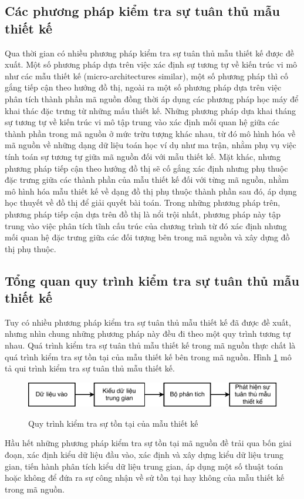 \documentclass[12pt]{report}
\begin{document}
\subsection{Các phương pháp kiểm tra sự tuân thủ mẫu thiết kế}
Qua thời gian có nhiều phương pháp kiểm tra sự tuân thủ mẫu thiết kế được đề xuất. Một số phương pháp dựa trên việc xác định sự tương tự về kiến trúc vi mô như các mẫu thiết kế (micro-architectures similar), một số phương pháp thì cố gắng tiếp cận theo hướng đồ thị, ngoài ra một số phương pháp dựa trên việc phân tích thành phần mã nguồn đồng thời áp dụng các phương pháp học máy để khai thác đặc trưng từ những mấu thiết kế. Những phương pháp dựa khai tháng sự tương tự về kiến trúc vi mô tập trung vào xác định mối quan hệ giữa các thành phần trong mã nguồn ở mức trừu tượng khác nhau, từ đó mô hình hóa về mã nguồn về những dạng dữ liệu toán học ví dụ như ma trận, nhằm phụ vụ việc tính toán sự tương tự giữa mã nguồn đối với mẫu thiết kế.
Mặt khác, nhưng phương pháp tiếp cận theo hướng đồ thị sẽ cố gắng xác định nhưng phụ thuộc đặc trưng giữa các thành phần của mẫu thiết kế đối với từng mã nguồn, nhằm mô hình hóa mẫu thiết kế về dạng đồ thị phụ thuộc thành phần sau đó, áp dụng học thuyết về đồ thị để giải quyết bài toán. Trong những phương pháp trên, phương pháp tiếp cận dựa trên đồ thị là nổi trội nhất, phương pháp này tập trung vào việc phân tích tĩnh cấu trúc của chương trình từ đó xác định nhưng mối quan hệ đặc trưng giữa các đối tượng bên trong mã nguồn và xây dựng đồ thị phụ thuộc.

\subsection{Tổng quan quy trình kiểm tra sự tuân thủ mẫu thiết kế}
Tuy có nhiều phương pháp kiểm tra sự tuân thủ mẫu thiết kế đã được đề xuất, nhưng nhìn chung những phương pháp này đều đi theo một quy trình tương tự nhau. Quá trình kiểm tra sự tuân thủ mẫu thiết kế trong mã nguồn thực chất là quá trình kiểm tra sự tồn tại của mẫu thiết kế bên trong mã nguồn.
Hình \ref{fig:ddp_process} mô tả qui trình kiểm tra sự tuân thủ mẫu thiết kế.
\begin{figure}[h]
	\centering
	\includegraphics[scale=0.3]{images/ddp}
	\label{fig:ddp_process}
	\caption{Quy trình kiểm tra sự tồn tại của mẫu thiết kế}
\end{figure}
Hầu hết những phương pháp kiểm tra sự tồn tại mã nguồn đề trải qua bốn giai đoạn, xác định kiểu dữ liệu đầu vào, xác định và xây dựng kiểu dữ liệu trung gian, tiến hành phân tích kiểu dữ liệu trung gian, áp dụng một số thuật toán hoặc không để đứa ra sự công nhận về sử tồn tại hay không của mẫu thiết kế trong mã nguồn.
\end{document}
